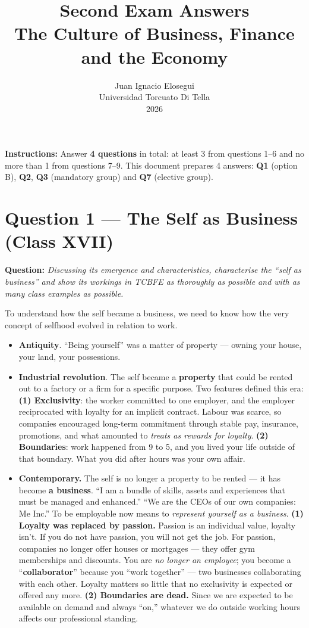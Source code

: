 \documentclass[11pt,a4paper]{article}
\title{Second Exam Answers\\
\large The Culture of Business, Finance and the Economy}
\author{Juan Ignacio Elosegui\\
\small Universidad Torcuato Di Tella\\
\small 2026}
\date{}
\begin{document}
\maketitle

\textbf{Instructions:} Answer \textbf{4 questions} in total: at least 3 from questions 1--6 and no more than 1 from questions 7--9. This document prepares 4 answers: \textbf{Q1} (option B), \textbf{Q2}, \textbf{Q3} (mandatory group) and \textbf{Q7} (elective group).

\section*{Question 1 --- The Self as Business (Class XVII)}

\textbf{Question:} \textit{Discussing its emergence and characteristics, characterise the ``self as business'' and show its workings in TCBFE as thoroughly as possible and with as many class examples as possible.}

To understand how the self became a business, we need to know how the very concept of selfhood evolved in relation to work.
\begin{itemize}
	\item \textbf{Antiquity}. ``Being yourself'' was a matter of property --- owning your house, your land, your possessions.
	\item \textbf{Industrial revolution}. The self became a \textbf{property} that could be rented out to a factory or a firm for a specific purpose. Two features defined this era:
	      \subitem \textbf{(1) Exclusivity}: the worker committed to one employer, and the employer reciprocated with loyalty for an implicit contract. Labour was scarce, so companies encouraged long-term commitment through stable pay, insurance, promotions, and what amounted to \textit{treats as rewards for loyalty}.
	      \subitem \textbf{(2) Boundaries}: work happened from 9 to 5, and you lived your life outside of that boundary. What you did after hours was your own affair.
	\item \textbf{Contemporary.} The self is no longer a property to be rented --- it has become \textbf{a business}. ``I am a bundle of skills, assets and experiences that must be managed and enhanced.'' ``We are the CEOs of our own companies: Me Inc.'' To be employable now means to \textit{represent yourself as a business}.
	      \subitem \textbf{(1) Loyalty was replaced by passion.} Passion is an individual value, loyalty isn't. If you do not have passion, you will not get the job. For passion, companies no longer offer houses or mortgages --- they offer gym memberships and discounts. You are \textit{no longer an employee}; you become a ``\textbf{collaborator}'' because you ``work together'' --- two businesses collaborating with each other. Loyalty matters so little that no exclusivity is expected or offered any more.
	      \subitem \textbf{(2) Boundaries are dead.} Since we are expected to be available on demand and always ``on,'' whatever we do outside working hours affects our professional standing.
\end{itemize}
\end{document}
